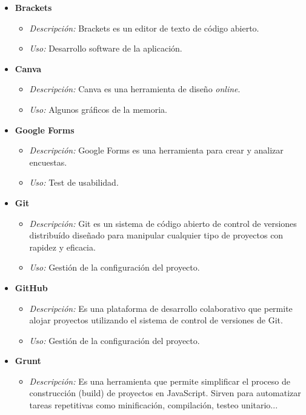 \begin{itemize}
\item \textbf{Brackets}
\begin{itemize}
\item \textit{Descripción: }Brackets es un editor de texto de código abierto\cite{brackets}.
\item \textit{Uso: }Desarrollo software de la aplicación.
\end{itemize}
\item \textbf{Canva}
\begin{itemize}
\item \textit{Descripción:} Canva es una herramienta de diseño \textit{online}\cite{canva}.
\item \textit{Uso: }Algunos gráficos de la memoria.
\end{itemize}
\item \textbf{Google Forms}
\begin{itemize}
\item \textit{Descripción: } Google Forms es una herramienta para crear y analizar encuestas\cite{google_forms}.
\item \textit{Uso: }Test de usabilidad.
\end{itemize}
\item \textbf{Git}
\begin{itemize}
\item \textit{Descripción: }Git es un sistema de código abierto de control de versiones distribuído diseñado para manipular cualquier tipo de proyectos con rapidez y eficacia\cite{git}.
\item \textit{Uso: }Gestión de la configuración del proyecto.
\end{itemize}
\item \textbf{GitHub}
\begin{itemize}
\item \textit{Descripción: }Es una plataforma de desarrollo colaborativo que permite alojar proyectos utilizando el sistema de control de versiones de Git\cite{github}.  
\item \textit{Uso: }Gestión de la configuración del proyecto.
\end{itemize}
\item \textbf{Grunt}
\begin{itemize}
\item \textit{Descripción: }Es una herramienta que permite simplificar el proceso de construcción (build) de proyectos en JavaScript. Sirven para automatizar tareas repetitivas como minificación, compilación, testeo unitario...\cite{grunt}

\end{itemize}
\end{itemize}
